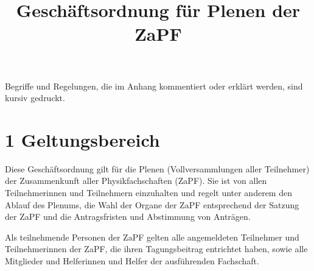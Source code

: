 \documentclass[12pt,oneside]{scrartcl}
\title{\phantomsection%
  Geschäftsordnung für Plenen der ZaPF%
  \label{geschaftsordnung-fur-plenen-der-zapf}}
\author{}
\date{}
\begin{document}
\maketitle

Begriffe und Regelungen, die im Anhang kommentiert oder erklärt werden, sind
kursiv gedruckt.


\section{1 Geltungsbereich%
  \label{geltungsbereich}%
}

Diese Geschäftsordnung gilt für die Plenen (Vollversammlungen aller Teilnehmer)
der Zusammenkunft aller Physikfachschaften (ZaPF).
Sie ist von allen Teilnehmerinnen und Teilnehmern einzuhalten und regelt unter
anderem den Ablauf des Plenums, die Wahl der Organe der ZaPF entsprechend der
Satzung der ZaPF und die Antragsfristen und Abstimmung von Anträgen.

Als teilnehmende Personen der ZaPF gelten alle angemeldeten Teilnehmer und
Teilnehmerinnen der ZaPF, die ihren Tagungsbeitrag entrichtet haben, sowie alle
Mitglieder und Helferinnen und Helfer der ausführenden Fachschaft.
\end{document}
